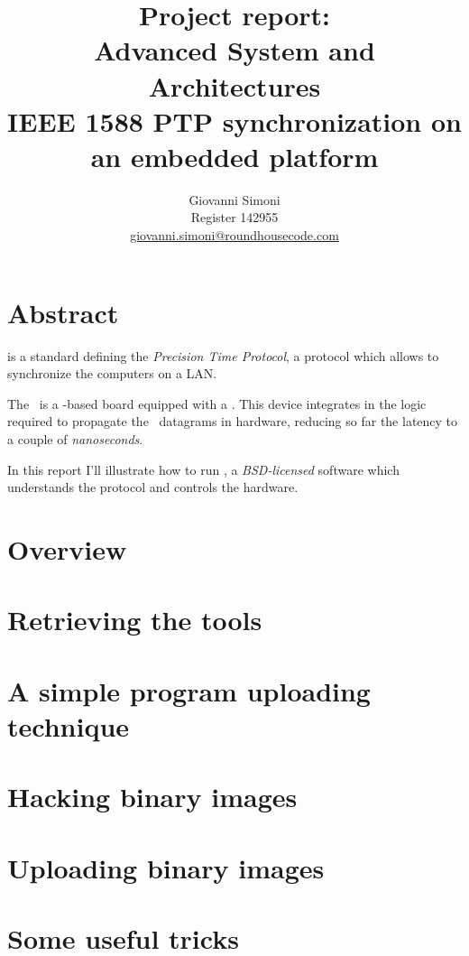 \documentclass[10pt,a4paper]{article}
\title {
    Project report:\\
    Advanced System and Architectures\\
    IEEE 1588 PTP synchronization on an embedded platform
}
\author{
    Giovanni Simoni\\
    Register 142955\\
    \href{mailto:giovanni.simoni@roundhousecode.com}
         {giovanni.simoni@roundhousecode.com}
}
\begin{document}
\maketitle

    \section*{ \center Abstract }

         is a standard defining the \emph{Precision
        Time Protocol}, a protocol which allows to synchronize the
        computers on a LAN.

        The \MyBoard\ is a \PPC-based board equipped with a
        . This device integrates in
        the logic required to propagate the \PTP\ datagrams in hardware,
        reducing so far the latency to a couple of \emph{nanoseconds}.

        In this report I'll illustrate how to run \PTPd, a
        \emph{BSD-licensed} software which understands the protocol and
        controls the hardware.

    \tableofcontents
    \newpage

    \section{ Overview } \label{sec:Overview}
    

    \section{ Retrieving the tools } \label{sec:GetTools}
    

    \section{ A simple program uploading technique } \label{sec:Upload}
    

    \section{ Hacking binary images } \label{sec:HackImages}
    

    \section{ Uploading binary images } \label{sec:UploadImages}
    


    \section{ Some useful tricks } \label{sec:Tricks}
    

\end{document}
